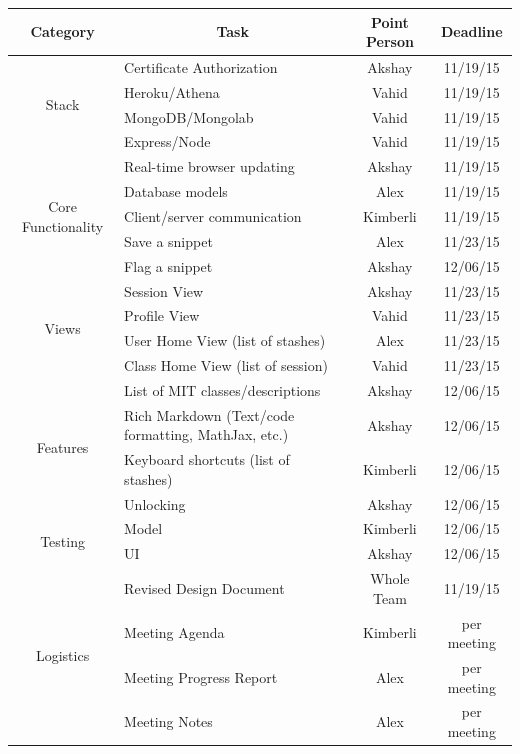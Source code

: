 \documentclass{article}
\begin{document}
 \begin{table}[!htbp]
 \centering
\begin{tabular}{|c| l |c|c|}
\hline
\textbf{Category} & \multicolumn{1}{|c|}{\textbf{Task}} & \textbf{Point Person} & \textbf{Deadline} \\
\hline

\multirow{4}{*}{Stack}
& Certificate Authorization  & Akshay  &  11/19/15 \\\cline{2-4}
& Heroku/Athena    & Vahid  &  11/19/15    \\\cline{2-4}
& MongoDB/Mongolab & Vahid  &  11/19/15    \\\cline{2-4}
& Express/Node  & Vahid  &  11/19/15    \\\cline{2-4}
\hline

\multirow{5}{*}{Core Functionality}
& Real-time browser updating  & Akshay  &  11/19/15 \\\cline{2-4}
& Database models    & Alex  &  11/19/15    \\\cline{2-4}
& Client/server communication & Kimberli  &  11/19/15    \\\cline{2-4}
& Save a snippet & Alex  &  11/23/15    \\\cline{2-4}
& Flag a snippet & Akshay  &  12/06/15    \\\cline{2-4}
\hline

\multirow{4}{*}{Views}
& Session View  & Akshay  &  11/23/15 \\\cline{2-4}
& Profile View  & Vahid  &  11/23/15    \\\cline{2-4}
& User Home View (list of stashes)  & Alex  &  11/23/15    \\\cline{2-4}
& Class Home View (list of session) & Vahid  &  11/23/15    \\\cline{2-4}
\hline

\multirow{4}{*}{Features}
& List of MIT classes/descriptions  & Akshay  &  12/06/15 \\\cline{2-4}
& Rich Markdown (Text/code formatting, MathJax, etc.)  & Akshay  &  12/06/15    \\\cline{2-4}
& Keyboard shortcuts (list of stashes)  & Kimberli  &  12/06/15    \\\cline{2-4}
& Unlocking  & Akshay  &  12/06/15    \\\cline{2-4}
\hline


\multirow{2}{*}{Testing}
& Model  & Kimberli  &  12/06/15 \\\cline{2-4}
& UI  & Akshay  &  12/06/15    \\\cline{2-4}
\hline

\multirow{4}{*}{Logistics}
& Revised Design Document & Whole Team  &  11/19/15 \\\cline{2-4}
& Meeting Agenda & Kimberli  &  per meeting \\\cline{2-4}
& Meeting Progress Report & Alex  &  per meeting \\\cline{2-4}
& Meeting Notes & Alex  &  per meeting \\\cline{2-4}
\hline

\end{tabular}
\end{table}
\end{document}
